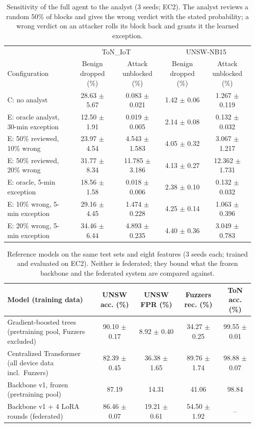 \begin{table}[t]\centering
\caption{Sensitivity of the full agent to the analyst (3 seeds; EC2). The analyst reviews a random 50\% of blocks and gives the wrong verdict with the stated probability; a wrong verdict on an attacker rolls its block back and grants it the learned exception.}
\label{tab:analyst}
\begin{tabular}{lcccc}\toprule
 & \multicolumn{2}{c}{ToN\_IoT} & \multicolumn{2}{c}{UNSW-NB15} \\
Configuration & Benign dropped (\%) & Attack unblocked (\%) & Benign dropped (\%) & Attack unblocked (\%) \\ \midrule
C: no analyst & 28.63 $\pm$ 5.67 & 0.083 $\pm$ 0.021 & 1.42 $\pm$ 0.06 & 1.267 $\pm$ 0.119 \\
E: oracle analyst, 30-min exception & 12.50 $\pm$ 1.91 & 0.019 $\pm$ 0.005 & 2.14 $\pm$ 0.08 & 0.132 $\pm$ 0.032 \\
E: 50\% reviewed, 10\% wrong & 23.97 $\pm$ 4.54 & 4.543 $\pm$ 1.583 & 4.05 $\pm$ 0.32 & 3.067 $\pm$ 1.217 \\
E: 50\% reviewed, 20\% wrong & 31.77 $\pm$ 8.34 & 11.785 $\pm$ 3.186 & 4.13 $\pm$ 0.27 & 12.362 $\pm$ 1.731 \\
E: oracle, 5-min exception & 18.56 $\pm$ 1.58 & 0.018 $\pm$ 0.006 & 2.38 $\pm$ 0.10 & 0.132 $\pm$ 0.032 \\
E: 10\% wrong, 5-min exception & 29.16 $\pm$ 4.45 & 1.474 $\pm$ 0.228 & 4.25 $\pm$ 0.14 & 1.063 $\pm$ 0.396 \\
E: 20\% wrong, 5-min exception & 34.46 $\pm$ 6.44 & 4.893 $\pm$ 0.235 & 4.40 $\pm$ 0.36 & 3.049 $\pm$ 0.783 \\
\bottomrule\end{tabular}\end{table}

\begin{table}[t]\centering
\caption{Reference models on the same test sets and eight features (3 seeds each; trained and evaluated on EC2). Neither is federated; they bound what the frozen backbone and the federated system are compared against.}
\label{tab:refs}
\begin{tabular}{lcccc}\toprule
Model (training data) & UNSW acc. (\%) & UNSW FPR (\%) & Fuzzers rec. (\%) & ToN acc. (\%) \\ \midrule
Gradient-boosted trees (pretraining pool, Fuzzers excluded) & 90.10 $\pm$ 0.17 & 8.92 $\pm$ 0.40 & 34.27 $\pm$ 0.25 & 99.55 $\pm$ 0.01 \\
Centralized Transformer (all device data incl.\ Fuzzers) & 82.39 $\pm$ 0.45 & 36.38 $\pm$ 1.65 & 89.76 $\pm$ 1.74 & 98.88 $\pm$ 0.07 \\
Backbone v1, frozen (pretraining pool) & 87.19 & 14.31 & 41.06 & 98.84 \\
Backbone v1 + 4 LoRA rounds (federated) & 86.46 $\pm$ 0.07 & 19.21 $\pm$ 0.61 & 54.50 $\pm$ 1.92 & -- \\
\bottomrule\end{tabular}\end{table}
